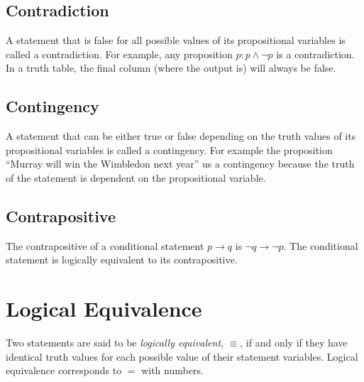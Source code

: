 \subsection{Contradiction}
A statement that is false for all possible values of its propositional variables is called a contradiction. For example, any proposition $p: p \wedge \neg p$ is a contradiction. In a truth table, the final column (where the output is) will always be false. 
\subsection{Contingency}
A statement that can be either true or false depending on the truth values of its propositional variables is called a contingency. For example the proposition ``Murray will win the Wimbledon next year'' us a contingency because the truth of the statement is dependent on the propositional variable. 
\subsection{Contrapositive}
The contrapositive of a conditional statement $p \rightarrow q$ is $\neg q \rightarrow \neg p$. The conditional statement is logically equivalent to its contrapositive.

\section{Logical Equivalence}
Two statements are said to be \textit{logically equivalent}, $\equiv$, if and only if they have identical truth values for each possible value of their statement variables. Logical equivalence corresponds to $=$ with numbers.\\

